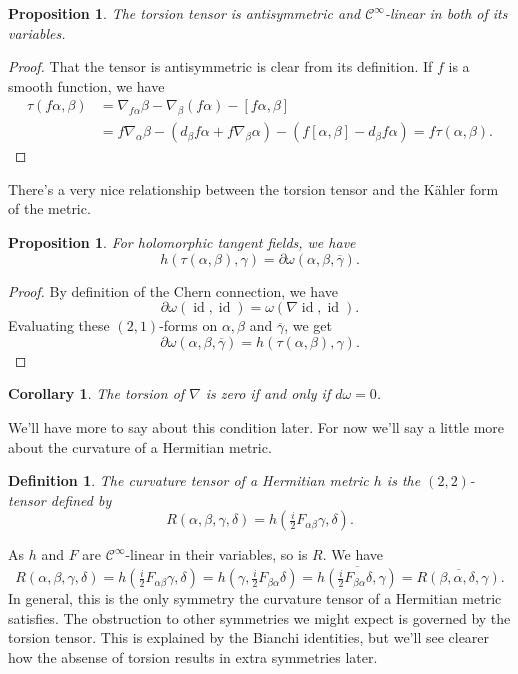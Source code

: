 \documentclass[11pt]{article}
\newtheorem{prop}[theo]{Proposition}
\newtheorem{coro}[theo]{Corollary}
\newtheorem{defi}[theo]{Definition}
\newtheorem*{proof}{Proof}
\newcommand{\cc}[1]{\mathcal{#1}}
\def\qedhere{}
\DeclareMathOperator{\id}{id}
\begin{document}
\begin{prop}
The torsion tensor is antisymmetric and $\cc C^\infty$-linear in both of its variables.
\end{prop}

\begin{proof}
  That the tensor is antisymmetric is clear from its definition. If $f$ is a smooth function, we have
\begin{align*}
\tau(f\alpha,\beta)
&= \nabla_{f\alpha}\beta - \nabla_\beta(f\alpha) - [f\alpha,\beta]
\\
&= f\nabla_\alpha \beta - (d_\beta f \alpha + f \nabla_\beta \alpha) - (f[\alpha,\beta] - d_\beta f \alpha)
= f \tau(\alpha,\beta).
\qedhere
\end{align*}
\end{proof}

There's a very nice relationship between the torsion tensor and the K\"ahler form of the metric.

\begin{prop}
For holomorphic tangent fields, we have
$$
h(\tau(\alpha,\beta), \gamma)
= \partial\omega(\alpha,\beta,\overline\gamma).
$$
\end{prop}

\begin{proof}
By definition of the Chern connection, we have
$$
\partial \omega(\id, \id)
= \omega(\nabla \id, \id).
$$
Evaluating these $(2,1)$-forms on $\alpha, \beta$ and $\overline\gamma$, we get
\[
\partial\omega(\alpha,\beta,\overline{\gamma})
= h(\tau(\alpha,\beta), \gamma).
\qedhere
\]
\end{proof}

\begin{coro}
\label{coro:kahler-zero-torsion}
The torsion of $\nabla$ is zero if and only if $d\omega = 0$.
\end{coro}


We'll have more to say about this condition later. For now we'll say a little more about the curvature of a Hermitian metric.


\begin{defi}
The \emph{curvature tensor} of a Hermitian metric $h$ is the $(2,2)$-tensor defined by
$$
R(\alpha,\beta,\gamma,\delta)
= h(\tfrac i2 F_{\alpha\beta}\gamma, \delta).
$$
\end{defi}

As $h$ and $F$ are $\cc C^\infty$-linear in their variables, so is $R$. We have
$$
R(\alpha,\beta,\gamma,\delta)
= h(\tfrac i2 F_{\alpha\beta}\gamma, \delta)
= h(\gamma, \tfrac i2 F_{\beta\alpha}\delta)
= \overline{h(\tfrac i2 F_{\beta\alpha}\delta, \gamma)}
= \overline{R(\beta,\alpha,\delta,\gamma)}.
$$
In general, this is the only symmetry the curvature tensor of a Hermitian metric satisfies. The obstruction to other symmetries we might expect is governed by the torsion tensor. This is explained by the Bianchi identities, but we'll see clearer how the absense of torsion results in extra symmetries later.
\end{document}
